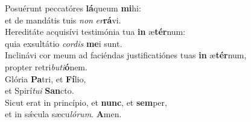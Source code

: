 \evenverse Posuérunt peccatóres \textbf{lá}queum \textbf{mi}hi:~\*\\
\evenverse et de mandátis tuis \textit{non} \textit{er}\textbf{rá}vi.\\
\oddverse Hereditáte acquisívi testimónia tua \textbf{in} æ\textbf{tér}num:~\*\\
\oddverse quia exsultátio \textit{cor}\textit{dis} \textbf{me}i sunt.\\
\evenverse Inclinávi cor meum ad faciéndas justificatiónes tuas \textbf{in} æ\textbf{tér}num,~\*\\
\evenverse propter retri\textit{bu}\textit{ti}\textbf{ó}nem.\\
\oddverse Glória \textbf{Pa}tri, et \textbf{Fí}lio,~\*\\
\oddverse et Spirí\textit{tu}\textit{i} \textbf{San}cto.\\
\evenverse Sicut erat in princípio, et \textbf{nunc}, et \textbf{sem}per,~\*\\
\evenverse et in sǽcula sæcu\textit{ló}\textit{rum}. \textbf{A}men.\\
